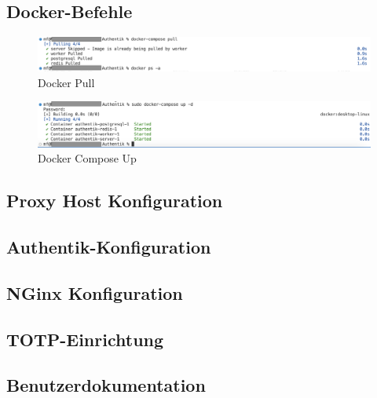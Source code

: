 \subsection{Docker-Befehle}
\label{app:dockercommands}
\begin{figure}[ht]
    \centering
    \includegraphics[scale=0.4]{Bilder/Authentik-Doc/DP_00_DockerPull.png}
    \caption{Docker Pull}
  \end{figure}
  
  \vspace{0.5cm} %
  
  \begin{figure}[ht]
    \centering
    \includegraphics[scale=0.4]{Bilder/Authentik-Doc/DP_01_DockerComposeUp.png}
    \caption{Docker Compose Up}
  \end{figure}

\subsection{Proxy Host Konfiguration}
\label{app:ProxyHostConfig}

\subsection{Authentik-Konfiguration}
\label{app:AuthentikConfig}


\subsection{NGinx Konfiguration}
\label{app:CustomNGinxConfig}
\clearpage
\begin{figure}[htb]
    \centering
\end{figure}

\subsection{TOTP-Einrichtung}
\label{sec:TOTPConfig}

\subsection{Benutzerdokumentation}
\label{app:Benutzerdokumentation}
